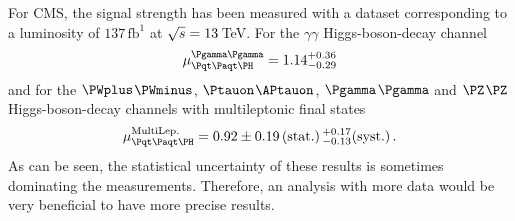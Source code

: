 For CMS, the \ttH signal strength has been measured
with a dataset corresponding to a luminosity of $137\,\text{fb}^{1}$
at $\sqrt{s}=13\,$TeV.
For the $\gamma$$\gamma$ Higgs-boson-decay 
channel~\cite{CMS:2020cga}
\begin{equation*}
	\mu^{\Pgamma \Pgamma}_{\ttH} = 1.14^{+0.36} _{-0.29}
\end{equation*}
and for the $\PWplus$$\PWminus$, $\Ptauon$$\APtauon$, $\Pgamma$$\Pgamma$ and $\PZ$$\PZ$ Higgs-boson-decay channels
with multileptonic final states~\cite{CMS-PAS-HIG-19-008}
\begin{equation*}
	\mu^{\text{MultiLep.}}_{\ttH} = 0.92 \pm 0.19\,(\text{stat.})\, ^{+0.17} _{-0.13} (\text{syst.})\, .
\end{equation*}
As can be seen, the statistical uncertainty of these results is sometimes dominating 
the measurements. Therefore, an analysis with more data would be very beneficial
to have more precise results.





